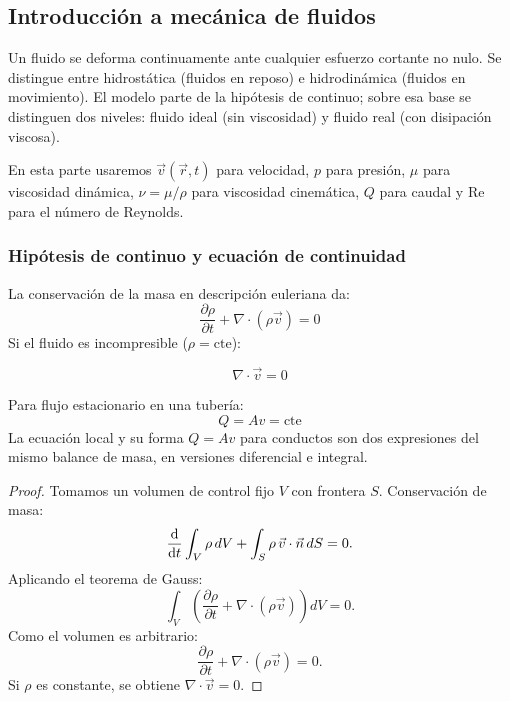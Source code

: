 \documentclass[12pt, a4paper]{article}
\theoremstyle{plain}
\theoremstyle{definition}
\theoremstyle{remark}
\newcommand{\ve}[1]{\vec{#1}}
\begin{document}
\subsection{Introducción a mecánica de fluidos}

Un fluido se deforma continuamente ante cualquier esfuerzo cortante no nulo. Se distingue
entre hidrostática (fluidos en reposo) e hidrodinámica (fluidos en movimiento).
El modelo parte de la hipótesis de continuo; sobre esa base se distinguen dos niveles:
fluido ideal (sin viscosidad) y fluido real (con disipación viscosa).

En esta parte usaremos $\ve{v}(\ve{r},t)$ para velocidad, $p$ para presión, $\mu$ para
viscosidad dinámica, $\nu=\mu/\rho$ para viscosidad cinemática, $Q$ para caudal y
$\mathrm{Re}$ para el número de Reynolds.

\subsubsection{Hipótesis de continuo y ecuación de continuidad}

La conservación de la masa en descripción euleriana da:
\begin{equation}
  \frac{\partial \rho}{\partial t} + \nabla\cdot(\rho\ve{v}) = 0
\end{equation}
Si el fluido es incompresible ($\rho=\text{cte}$):
\begin{mdframed}[style=resultado]
\begin{equation}
  \nabla\cdot\ve{v} = 0
\end{equation}
\end{mdframed}

Para flujo estacionario en una tubería:
\begin{equation}
  Q = A v = \text{cte}
\end{equation}
La ecuación local y su forma $Q=Av$ para conductos son dos expresiones del mismo balance de
masa, en versiones diferencial e integral.

\begin{proof}
Tomamos un volumen de control fijo $V$ con frontera $S$. Conservación de masa:
\begin{equation}
  \dv{}{t}\int_V \rho\,dV + \int_S \rho\,\ve{v}\cdot\ve{n}\,dS = 0.
\end{equation}
Aplicando el teorema de Gauss:
\begin{equation}
  \int_V\left(\frac{\partial \rho}{\partial t}+\nabla\cdot(\rho\ve{v})\right)dV=0.
\end{equation}
Como el volumen es arbitrario:
\begin{equation}
  \frac{\partial \rho}{\partial t}+\nabla\cdot(\rho\ve{v})=0.
\end{equation}
Si $\rho$ es constante, se obtiene
$\nabla\cdot\ve{v}=0$.
\end{proof}
\end{document}
